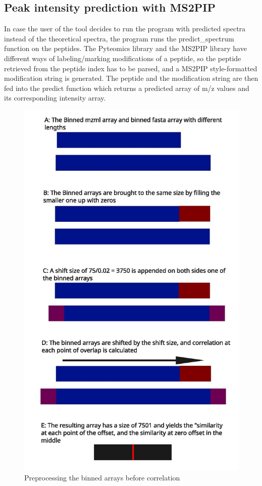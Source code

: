 \documentclass[11pt]{article}
\begin{document}
\subsection{Peak intensity prediction with MS2PIP}
In case the user of the tool decides to run the program with predicted spectra instead of the theoretical spectra, the program runs the predict\_spectrum function on the peptides. The Pyteomics library and the MS2PIP library have different ways of labeling/marking modifications of a peptide, so the peptide retrieved from the peptide index has to be parsed, and a MS2PIP style-formatted modification string is generated. The peptide and the modification string are then fed into the predict function which returns a predicted array of m/z values and its corresponding intensity array.
\begin{figure}
\includegraphics[width=\linewidth]{figs/crosscorr.jpg} 
\caption{Preprocessing the binned arrays before correlation}
\label{fig:corr}
\end{figure}
\end{document}
